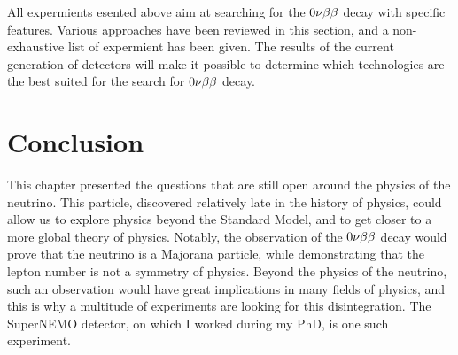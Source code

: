 All expermients esented above aim at searching for the $0\nu\beta\beta$ decay with specific features.
Various approaches have been reviewed in this section, and a non-exhaustive list of expermient has been given.
The results of the current generation of detectors will make it possible to determine which technologies are the best suited for the search for $0\nu\beta\beta$ decay.





\section{Conclusion}

This chapter presented the questions that are still open around the physics of the neutrino.
This particle, discovered relatively late in the history of physics, could allow us to explore physics beyond the Standard Model, and to get closer to a more global theory of physics.
Notably, the observation of the $0\nu\beta\beta$ decay would prove that the neutrino is a Majorana particle, while demonstrating that the lepton number is not a symmetry of physics.
Beyond the physics of the neutrino, such an observation would have great implications in many fields of physics, and this is why a multitude of experiments are looking for this disintegration.
The SuperNEMO detector, on which I worked during my PhD, is one such experiment.
